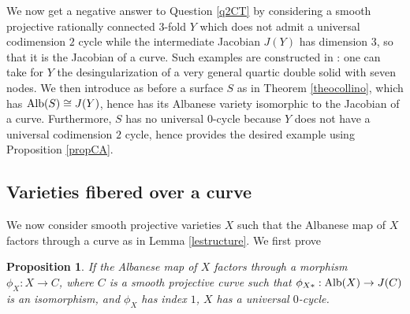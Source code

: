 \documentclass[10pt]{article}
\newtheorem{prop}[theo]{Proposition}
\begin{document}
We now  get a negative answer to Question \ref{q2CT} by considering a smooth projective rationally connected $3$-fold $Y$ which does not admit a universal codimension $2$ cycle while the intermediate Jacobian  $J(Y)$ has dimension $3$, so that it is the Jacobian of a curve. Such examples are constructed in \cite{voisinINVENT}: one can take for $Y$ the desingularization of a very general quartic double solid with seven nodes. We then introduce as before a surface $S$ as in Theorem \ref{theocollino}, which has ${\rm Alb}(S)\cong J(Y)$, hence has its Albanese variety isomorphic to the Jacobian of a curve. Furthermore, $S$ has no universal $0$-cycle because $Y$ does not have a universal codimension $2$ cycle, hence provides the desired example using Proposition \ref{propCA}.

\subsection{Varieties fibered over a curve\label{sec1feberedvar}}
We now consider smooth projective varieties $X$ such that the Albanese map of $X$ factors through a curve   as in  Lemma \ref{lestructure}.
 We first prove
\begin{prop}\label{coroaprouver} If the Albanese map of $X$  factors through a morphism
$ \phi_X:X\rightarrow C $, where $C$ is  a smooth projective curve such that $\phi_{X*}: {\rm Alb}(X)\rightarrow J(C) $ is an isomorphism,  and $\phi_X$  has index $1$, $X$ has a universal $0$-cycle.
\end{prop}
\end{document}

